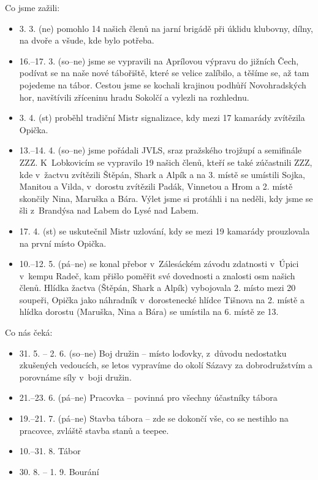\documentclass[11pt]{article}
\begin{document}
\vspace*{12pt}\noindent
Co jsme zažili:
\begin{itemize}[
  itemsep=-3pt,
  leftmargin=2em,
  itemindent=-1em
]
  \item[] 3. 3. (ne) pomohlo 14 našich členů na jarní brigádě při úklidu klubovny, dílny, na dvoře a všude, kde bylo potřeba.
  \item[] 16.–17. 3. (so–ne) jsme se vypravili na Aprílovou výpravu do jižních Čech, podívat se na naše nové tábořiště, které se velice zalíbilo, a těšíme se, až tam pojedeme na tábor. Cestou jsme se kochali krajinou podhůří Novohradských hor, navštívili zříceninu hradu Sokolčí a vylezli na rozhlednu.
  \item[] 3. 4. (st) proběhl tradiční Mistr signalizace, kdy mezi 17 kamarády zvítězila Opička.
  \item[] 13.–14. 4. (so–ne) jsme pořádali JVLS, sraz pražského trojžupí a semifinále ZZZ. K~Lobkovicím se vypravilo 19 našich členů, kteří se také zúčastnili ZZZ, kde v~žactvu zvítězili Štěpán, Shark a Alpík a na 3. místě se umístili Sojka, Manitou a Vilda, v~dorostu zvítězili Padák, Vinnetou a Hrom a 2. místě skončily Nina, Maruška a Bára. Výlet jsme si protáhli i na neděli, kdy jsme se šli z~Brandýsa nad Labem do Lysé nad Labem.
  \item[] 17. 4. (st) se uskutečnil Mistr uzlování, kdy se mezi 19 kamarády prouzlovala na první místo Opička.
  \item[] 10.–12. 5. (pá–ne) se konal přebor v~Zálesáckém závodu zdatnosti v~Úpici v~kempu Radeč, kam přišlo poměřit své dovednosti a znalosti osm našich členů. Hlídka žactva (Štěpán, Shark a Alpík) vybojovala 2. místo mezi 20 soupeři, Opička jako náhradník v~dorostenecké hlídce Tišnova na 2. místě a hlídka dorostu (Maruška, Nina a Bára) se umístila na 6. místě ze 13.
\end{itemize}

\vspace*{6pt}
\noindent
Co nás čeká:
\begin{itemize}[
  itemsep=-3pt,
  leftmargin=2em,
  itemindent=-1em
]
  \item[] 31. 5. – 2. 6. (so–ne) Boj družin – místo loďovky, z~důvodu nedostatku zkušených vedoucích, se letos vypravíme do okolí Sázavy za dobrodružstvím a porovnáme síly v~boji družin.
  \item[] 21.–23. 6. (pá–ne) Pracovka – povinná pro všechny účastníky tábora
  \item[] 19.–21. 7. (pá–ne) Stavba tábora – zde se dokončí vše, co se nestihlo na pracovce, zvláště stavba stanů a teepee.
  \item[] 10.–31. 8. Tábor
  \item[] 30. 8. – 1. 9. Bourání
\end{itemize}
\end{document}
